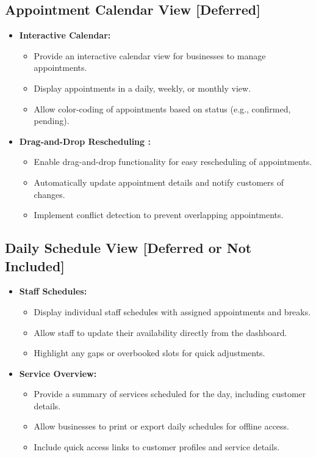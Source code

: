 \subsection{Appointment Calendar View [Deferred]}
\begin{itemize}[leftmargin=*]
    \item \textbf{Interactive Calendar:}
    \begin{itemize}
        \item Provide an interactive calendar view for businesses to manage appointments.
        \item Display appointments in a daily, weekly, or monthly view.
        \item Allow color-coding of appointments based on status (e.g., confirmed, pending).
    \end{itemize}
    
    \item \textbf{Drag-and-Drop Rescheduling :}
    \begin{itemize}
        \item Enable drag-and-drop functionality for easy rescheduling of appointments.
        \item Automatically update appointment details and notify customers of changes.
        \item Implement conflict detection to prevent overlapping appointments.
    \end{itemize}
\end{itemize}

\subsection{Daily Schedule View [Deferred or Not Included]}
\begin{itemize}[leftmargin=*]
    \item \textbf{Staff Schedules:}
    \begin{itemize}
        \item Display individual staff schedules with assigned appointments and breaks.
        \item Allow staff to update their availability directly from the dashboard.
        \item Highlight any gaps or overbooked slots for quick adjustments.
    \end{itemize}
    
    \item \textbf{Service Overview:}
    \begin{itemize}
        \item Provide a summary of services scheduled for the day, including customer details.
        \item Allow businesses to print or export daily schedules for offline access.
        \item Include quick access links to customer profiles and service details.
    \end{itemize}
\end{itemize}

